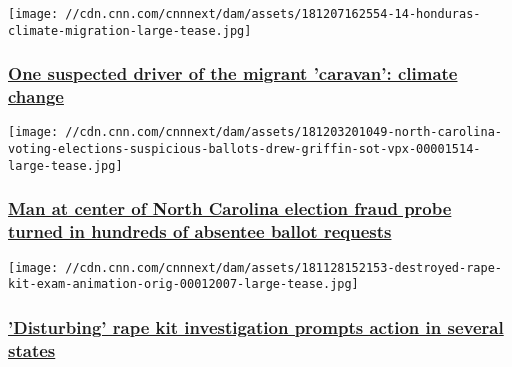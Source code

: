 \href{/2018/12/11/politics/climate-caravan-honduras-sutter/index.html}{}

\texttt{[image: //cdn.cnn.com/cnnnext/dam/assets/181207162554-14-honduras-climate-migration-large-tease.jpg]}

\hypertarget{one-suspected-driver-of-the-migrant-caravan-climate-change}{%
\subsubsection{\texorpdfstring{\href{/2018/12/11/politics/climate-caravan-honduras-sutter/index.html}{One
suspected driver of the migrant 'caravan': climate
change}}{One suspected driver of the migrant 'caravan': climate change}}\label{one-suspected-driver-of-the-migrant-caravan-climate-change}}

\href{/2018/12/04/politics/north-carolina-house-race-mccrae-dowless-absentee-ballots/index.html}{}

\texttt{[image: //cdn.cnn.com/cnnnext/dam/assets/181203201049-north-carolina-voting-elections-suspicious-ballots-drew-griffin-sot-vpx-00001514-large-tease.jpg]}

\hypertarget{man-at-center-of-north-carolina-election-fraud-probe-turned-in-hundreds-of-absentee-ballot-requests}{%
\subsubsection{\texorpdfstring{\href{/2018/12/04/politics/north-carolina-house-race-mccrae-dowless-absentee-ballots/index.html}{Man
at center of North Carolina election fraud probe turned in hundreds of
absentee ballot
requests}}{Man at center of North Carolina election fraud probe turned in hundreds of absentee ballot requests}}\label{man-at-center-of-north-carolina-election-fraud-probe-turned-in-hundreds-of-absentee-ballot-requests}}

\href{/2018/12/05/health/rape-kits-destroyed-reaction-national-invs/index.html}{}

\texttt{[image: //cdn.cnn.com/cnnnext/dam/assets/181128152153-destroyed-rape-kit-exam-animation-orig-00012007-large-tease.jpg]}

\hypertarget{disturbing-rape-kit-investigation-prompts-action-in-several-states}{%
\subsubsection{\texorpdfstring{\href{/2018/12/05/health/rape-kits-destroyed-reaction-national-invs/index.html}{'Disturbing'
rape kit investigation prompts action in several
states}}{'Disturbing' rape kit investigation prompts action in several states}}\label{disturbing-rape-kit-investigation-prompts-action-in-several-states}}

